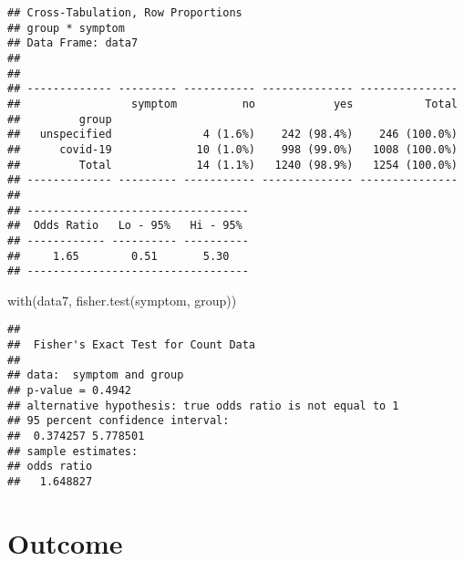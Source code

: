 \documentclass[
]{article}
\newenvironment{Shaded}{\begin{snugshade}}{\end{snugshade}}
\newcommand{\FunctionTok}[1]{\textcolor[rgb]{0.00,0.00,0.00}{#1}}
\newcommand{\NormalTok}[1]{#1}
\begin{document}
\begin{verbatim}
## Cross-Tabulation, Row Proportions  
## group * symptom  
## Data Frame: data7  
## 
## 
## ------------- --------- ----------- -------------- ---------------
##                 symptom          no            yes           Total
##         group                                                     
##   unspecified              4 (1.6%)    242 (98.4%)    246 (100.0%)
##      covid-19             10 (1.0%)    998 (99.0%)   1008 (100.0%)
##         Total             14 (1.1%)   1240 (98.9%)   1254 (100.0%)
## ------------- --------- ----------- -------------- ---------------
## 
## ----------------------------------
##  Odds Ratio   Lo - 95%   Hi - 95% 
## ------------ ---------- ----------
##     1.65        0.51       5.30   
## ----------------------------------
\end{verbatim}

\begin{Shaded}
\begin{Highlighting}[]
\FunctionTok{with}\NormalTok{(data7, }\FunctionTok{fisher.test}\NormalTok{(symptom, group))}
\end{Highlighting}
\end{Shaded}

\begin{verbatim}
## 
##  Fisher's Exact Test for Count Data
## 
## data:  symptom and group
## p-value = 0.4942
## alternative hypothesis: true odds ratio is not equal to 1
## 95 percent confidence interval:
##  0.374257 5.778501
## sample estimates:
## odds ratio 
##   1.648827
\end{verbatim}

\hypertarget{outcome}{%
\section{Outcome}\label{outcome}}
\end{document}
